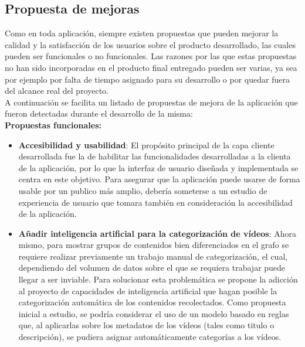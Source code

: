 \documentclass[11pt,a4paper]{article}
\begin{document}
\medskip 

\subsection{Propuesta de mejoras}
Como en toda aplicación, siempre existen propuestas que pueden mejorar la calidad y la satisfacción de los usuarios sobre el producto desarrollado, las cuales pueden ser funcionales o no funcionales. Las razones por las que estas propuestas no han sido incorporadas en el producto final entregado pueden ser varias, ya sea por ejemplo por falta de tiempo asignado para su desarrollo o por quedar fuera del alcance real del proyecto.
\\

A continuación se facilita un listado de propuestas de mejora de la aplicación que fueron detectadas durante el desarrollo de la misma:
\\

\noindent\textbf{Propuestas funcionales:}
\begin{itemize}
\item \textbf{Accesibilidad y usabilidad}: El propósito principal de la capa cliente desarrollada fue la de habilitar las funcionalidades desarrolladas a la clienta de la aplicación, por lo que la interfaz de usuario diseñada y implementada se centra en este objetivo. Para asegurar que la aplicación puede usarse de forma usable por un publico más amplio, debería someterse a un estudio de experiencia de usuario que tomara también en consideración la accesibilidad de la aplicación.
\item \textbf{Añadir inteligencia artificial para la categorización de vídeos}: Ahora mismo, para mostrar grupos de contenidos bien diferenciados en el grafo se requiere realizar previamente un trabajo manual de categorización, el cual, dependiendo del volumen de datos sobre el que se requiera trabajar puede llegar a ser inviable. Para solucionar esta problemática se propone la adicción al proyecto de capacidades de inteligencia artificial que hagan posible la categorización automática de los contenidos recolectados. Como propuesta inicial a estudio, se podría considerar el uso de un modelo basado en reglas que, al aplicarlas sobre los metadatos de los vídeos (tales como titulo o descripción), se pudiera asignar automáticamente categorías a los vídeos.
\end{itemize}
\medskip 
\end{document}
